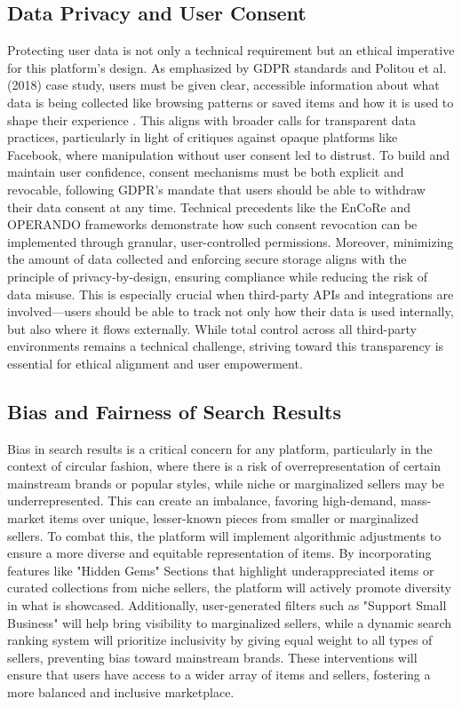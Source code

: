 \documentclass[10pt,twocolumn]{article}
\begin{document}
\subsection{Data Privacy and User Consent}
Protecting user data is not only a technical requirement but an ethical imperative for this platform’s design. As emphasized by GDPR standards and Politou et al. (2018) case study, users must be given clear, accessible information about what data is being collected like browsing patterns or saved items and how it is used to shape their experience \cite{politou2018gdpr}. This aligns with broader calls for transparent data practices, particularly in light of critiques against opaque platforms like Facebook, where manipulation without user consent led to distrust. To build and maintain user confidence, consent mechanisms must be both explicit and revocable, following GDPR’s mandate that users should be able to withdraw their data consent at any time. Technical precedents like the EnCoRe and OPERANDO frameworks demonstrate how such consent revocation can be implemented through granular, user-controlled permissions. Moreover, minimizing the amount of data collected and enforcing secure storage aligns with the principle of privacy-by-design, ensuring compliance while reducing the risk of data misuse. This is especially crucial when third-party APIs and integrations are involved—users should be able to track not only how their data is used internally, but also where it flows externally. While total control across all third-party environments remains a technical challenge, striving toward this transparency is essential for ethical alignment and user empowerment.

\subsection{Bias and Fairness of Search Results}
Bias in search results is a critical concern for any platform, particularly in the context of circular fashion, where there is a risk of overrepresentation of certain mainstream brands or popular styles, while niche or marginalized sellers may be underrepresented. This can create an imbalance, favoring high-demand, mass-market items over unique, lesser-known pieces from smaller or marginalized sellers. To combat this, the platform will implement algorithmic adjustments to ensure a more diverse and equitable representation of items. By incorporating features like "Hidden Gems" Sections that highlight underappreciated items or curated collections from niche sellers, the platform will actively promote diversity in what is showcased. Additionally, user-generated filters such as "Support Small Business" will help bring visibility to marginalized sellers, while a dynamic search ranking system will prioritize inclusivity by giving equal weight to all types of sellers, preventing bias toward mainstream brands. These interventions will ensure that users have access to a wider array of items and sellers, fostering a more balanced and inclusive marketplace.
\end{document}
